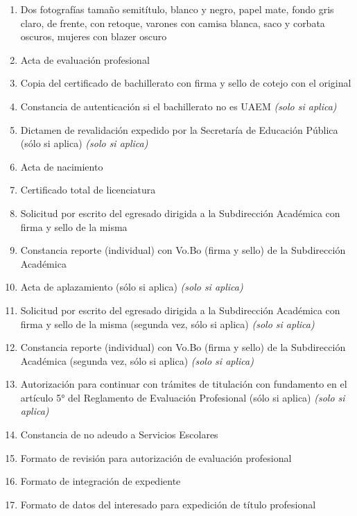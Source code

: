 \begin{enumerate}
  \item Dos fotografías tamaño semitítulo, blanco y negro, papel mate, fondo gris claro, de frente, con retoque, varones con camisa blanca, saco y corbata oscuros, mujeres con blazer oscuro
  \item Acta de evaluación profesional
  \item Copia del certificado de bachillerato con firma y sello de cotejo con el original
  \item Constancia de autenticación si el bachillerato no es UAEM \emph{(solo si aplica)}
  \item Dictamen de revalidación expedido por la Secretaría de Educación Pública (sólo si aplica) \emph{(solo si aplica)}
  \item Acta de nacimiento
  \item Certificado total de licenciatura
  \item Solicitud por escrito del egresado dirigida a la Subdirección Académica con firma y sello de la misma
  \item Constancia reporte (individual) con Vo.Bo (firma y sello) de la Subdirección Académica
  \item Acta de aplazamiento (sólo si aplica) \emph{(solo si aplica)}
  \item Solicitud por escrito del egresado dirigida a la Subdirección Académica con firma y sello de la misma (segunda vez, sólo si aplica) \emph{(solo si aplica)}
  \item Constancia reporte (individual) con Vo.Bo (firma y sello) de la Subdirección Académica (segunda vez, sólo si aplica) \emph{(solo si aplica)}
  \item Autorización para continuar con trámites de titulación con fundamento en el artículo 5° del Reglamento de Evaluación Profesional (sólo si aplica) \emph{(solo si aplica)}
  \item Constancia de no adeudo a Servicios Escolares
  \item Formato de revisión para autorización de evaluación profesional
  \item Formato de integración de expediente
  \item Formato de datos del interesado para expedición de título profesional
\end{enumerate}
